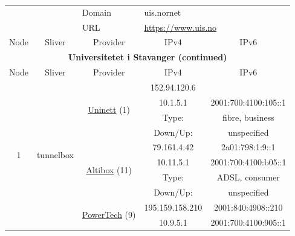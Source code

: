\begin{small}
\begin{center}
\begin{longtable}{|c|c|c|c|c|c|c|c|}
 \multicolumn{4}{|c|}{} & \multicolumn{1}{|l|}{Domain} & \multicolumn{3}{|l|}{\index{uis.nornet}uis.nornet} \\* \cline{5-5}\cline{6-6}\cline{7-7}\cline{8-8}
 \multicolumn{4}{|c|}{} & \multicolumn{1}{|l|}{URL} & \multicolumn{3}{|l|}{\url{https://www.uis.no}} \\ \hline
 \multicolumn{2}{|p{8em}|}{Node} & \multicolumn{2}{|p{8em}|}{Sliver} & \multicolumn{2}{|p{8em}|}{Provider} & IPv4 & IPv6 \\ \hline
\endfirsthead
\hline
 \multicolumn{8}{|c|}{\textbf{Universitetet i Stavanger (continued)}} \\ \hline
 \multicolumn{2}{|p{8em}|}{Node} & \multicolumn{2}{|p{8em}|}{Sliver} & \multicolumn{2}{|p{8em}|}{Provider} & IPv4 & IPv6 \\ \hline
\endhead
 \multirow{12}{*}{\tiny{1}} & \multicolumn{3}{|c|}{\multirow{12}{*}{\tiny{tunnelbox}}} & \multicolumn{2}{|c|}{\multirow{4}{*}{\tiny{\href{https://www.uninett.no}{Uninett} (1)}}} & \tiny{152.94.120.6} & \frownie{} \\* \cline{7-7}\cline{8-8}
  & \multicolumn{3}{|c|}{} & \multicolumn{2}{|c|}{} & \tiny{10.1.5.1} & \tiny{2001:700:4100:105::1} \\* \cline{7-7}\cline{8-8}
  & \multicolumn{3}{|c|}{} & \multicolumn{2}{|c|}{} & Type: & fibre, business \\* \cline{7-7}\cline{8-8}
  & \multicolumn{3}{|c|}{} & \multicolumn{2}{|c|}{} & Down/Up:  & unspecified \\* \cline{5-5}\cline{6-6}\cline{7-7}\cline{8-8}
  & \multicolumn{3}{|c|}{} & \multicolumn{2}{|c|}{\multirow{4}{*}{\tiny{\href{https://www.altibox.no}{Altibox} (11)}}} & \tiny{79.161.4.42} & \tiny{2a01:798:1:9::1} \\* \cline{7-7}\cline{8-8}
  & \multicolumn{3}{|c|}{} & \multicolumn{2}{|c|}{} & \tiny{10.11.5.1} & \tiny{2001:700:4100:b05::1} \\* \cline{7-7}\cline{8-8}
  & \multicolumn{3}{|c|}{} & \multicolumn{2}{|c|}{} & Type: & ADSL, consumer \\* \cline{7-7}\cline{8-8}
  & \multicolumn{3}{|c|}{} & \multicolumn{2}{|c|}{} & Down/Up:  & unspecified \\* \cline{5-5}\cline{6-6}\cline{7-7}\cline{8-8}
  & \multicolumn{3}{|c|}{} & \multicolumn{2}{|c|}{\multirow{4}{*}{\tiny{\href{http://www.powertech.no}{PowerTech} (9)}}} & \tiny{195.159.158.210} & \tiny{2001:840:4908::210} \\* \cline{7-7}\cline{8-8}
  & \multicolumn{3}{|c|}{} & \multicolumn{2}{|c|}{} & \tiny{10.9.5.1} & \tiny{2001:700:4100:905::1} \\* \cline{7-7}\cline{8-8}

\end{longtable}
\end{center}
\end{small}
